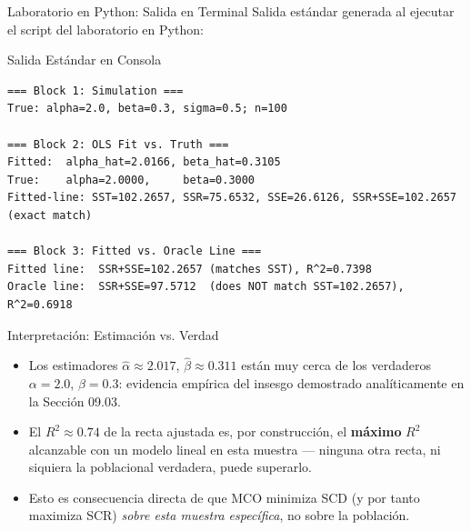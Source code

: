 \documentclass[10pt, aspectratio=169]{beamer}
\begin{document}
\begin{frame}[fragile]{Laboratorio en Python: Salida en Terminal}
  \scriptsize
  Salida estándar generada al ejecutar el script del laboratorio en Python:
  \vspace{0.02cm}
  \begin{block}{Salida Estándar en Consola}
    \fontsize{3.6pt}{4.3pt}\selectfont
    \begin{verbatim}
=== Block 1: Simulation ===
True: alpha=2.0, beta=0.3, sigma=0.5; n=100

=== Block 2: OLS Fit vs. Truth ===
Fitted:  alpha_hat=2.0166, beta_hat=0.3105
True:    alpha=2.0000,     beta=0.3000
Fitted-line: SST=102.2657, SSR=75.6532, SSE=26.6126, SSR+SSE=102.2657 (exact match)

=== Block 3: Fitted vs. Oracle Line ===
Fitted line:  SSR+SSE=102.2657 (matches SST), R^2=0.7398
Oracle line:  SSR+SSE=97.5712  (does NOT match SST=102.2657), R^2=0.6918
    \end{verbatim}
  \end{block}
\end{frame}

\begin{frame}{Interpretación: Estimación vs. Verdad}
  \footnotesize
  \begin{itemize}\itemsep=0.12cm
    \item Los estimadores $\hat\alpha\approx2.017$, $\hat\beta\approx0.311$ están muy cerca de los verdaderos $\alpha=2.0$, $\beta=0.3$: evidencia empírica del insesgo demostrado analíticamente en la Sección 09.03. \pause
    \item El $R^2\approx0.74$ de la recta ajustada es, por construcción, el \textbf{máximo} $R^2$ alcanzable con un modelo lineal en esta muestra --- ninguna otra recta, ni siquiera la poblacional verdadera, puede superarlo. \pause
    \item Esto es consecuencia directa de que MCO minimiza SCD (y por tanto maximiza SCR) \emph{sobre esta muestra específica}, no sobre la población.
  \end{itemize}
\end{frame}
\end{document}
